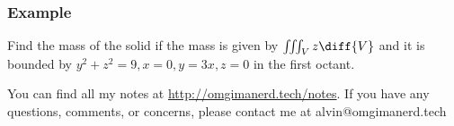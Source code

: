 \documentclass{math}
\begin{document}
\subsubsection*{Example}
Find the mass of the solid if the mass is given by \( \iiint_{V}z\diff{V} \)
and it is bounded by \( y^2+z^2 = 9, x = 0, y = 3x, z = 0 \) in the first
octant.

\begin{center}
  You can find all my notes at \url{http://omgimanerd.tech/notes}. If you have
  any questions, comments, or concerns, please contact me at
  alvin@omgimanerd.tech
\end{center}
\end{document}
